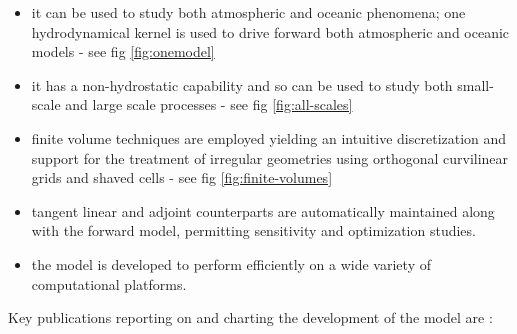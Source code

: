 \begin{itemize}
\item it can be used to study both atmospheric and oceanic phenomena; one
hydrodynamical kernel is used to drive forward both atmospheric and oceanic
models - see fig \ref{fig:onemodel}



\item it has a non-hydrostatic capability and so can be used to study both
small-scale and large scale processes - see fig \ref{fig:all-scales}



\item finite volume techniques are employed yielding an intuitive
discretization and support for the treatment of irregular geometries using
orthogonal curvilinear grids and shaved cells - see fig \ref{fig:finite-volumes}



\item tangent linear and adjoint counterparts are automatically maintained
along with the forward model, permitting sensitivity and optimization
studies.

\item the model is developed to perform efficiently on a wide variety of
computational platforms.
\end{itemize}

Key publications reporting on and charting the development of the model are
\cite{hill:95,marshall:97a,marshall:97b,adcroft:97,marshall:98,adcroft:99,hill:99,maro-eta:99}:

